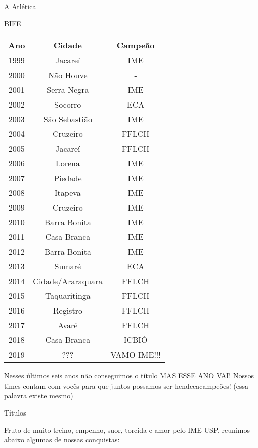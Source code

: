 \begin{secao}{A Atlética}
\begin{subsecao}{BIFE}
\begin{center}
  \begin{tabular}{c|c|c}
   Ano & Cidade & Campeão\\
   \hline
   1999 & Jacareí & IME\\
   2000 & Não Houve & - \\
   2001 & Serra Negra & IME\\
   2002 & Socorro & ECA\\
   2003 & São Sebastião & IME\\
   2004 & Cruzeiro & FFLCH\\
   2005 & Jacareí & FFLCH\\
   2006 & Lorena & IME\\
   2007 & Piedade & IME\\
   2008 & Itapeva & IME\\
   2009 & Cruzeiro & IME\\
   2010 & Barra Bonita & IME\\
   2011 & Casa Branca & IME\\
   2012 & Barra Bonita & IME\\
   2013 & Sumaré & ECA\\
   2014 & Cidade/Araraquara & FFLCH\\
   2015 & Taquaritinga & FFLCH\\
   2016 & Registro & FFLCH\\
   2017 & Avaré & FFLCH\\
   2018 & Casa Branca & ICBIÓ\\
   2019 & ??? & VAMO IME!!!
  \end{tabular}
\end{center}

Nesses últimos seis anos não conseguimos o título MAS ESSE ANO VAI! Nossos 
times contam com vocês para que juntos possamos ser hendecacampeões! (essa
palavra existe mesmo)

\end{subsecao}
\begin{subsecao}{Títulos}

Fruto de muito treino, empenho, suor, torcida e amor pelo IME-USP, reunimos
abaixo algumas de nossas conquistas:


\end{subsecao}
\end{secao}
